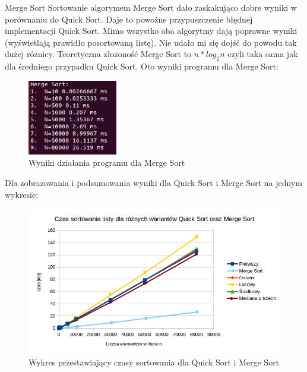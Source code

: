 \documentclass[11pt]{article}
\begin{document}
\newline
\newline
Merge Sort
\newline
Sortowanie algorymem Merge Sort dało zaskakująco dobre wyniki w porównaniu do Quick Sort. Daje to powożne przypuszczenie błędnej implementacji Quick Sort. Mimo wszystko oba algorytmy dają poprawne wyniki (wyświetlają prawidło posortowaną listę). Nie udało mi się dojść do powodu tak dużej różnicy. Teoretyczna złożoność Merge Sort to \begin{math} n*log_{2}n \end{math} czyli taka sama jak dla średniego przypadku Quick Sort. Oto wyniki programu dla Merge Sort:
\begin{figure}[ht]
\centering
\includegraphics[width=0.35\textwidth]{merge.png}
\caption{Wyniki działania programu dla Merge Sort}
\label{fig1}
\end{figure}
\newpage
Dla zobrazowania i podsumowania wyniki dla Quick Sort i Merge Sort na jednym wykresie:
\begin{figure}[ht]
\centering
\includegraphics[width=1\textwidth]{wykres2.png}
\caption{Wykres przestawiający czasy sortowania dla Quick Sort i Merge Sort}
\label{fig1}
\end{figure}
\end{document}
